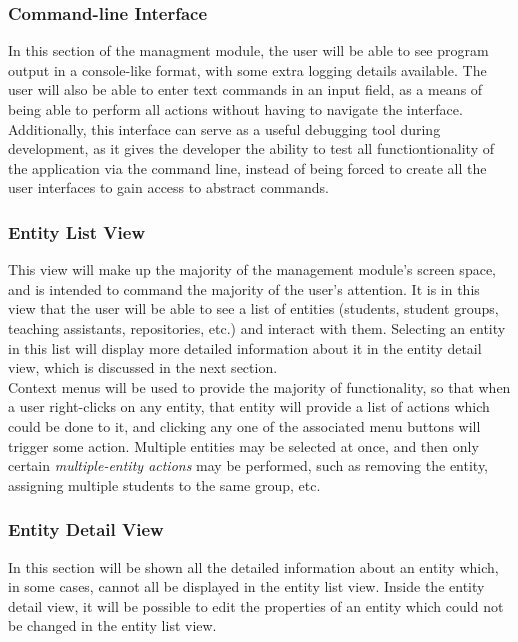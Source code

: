 \documentclass{article}
\begin{document}
		\subsubsection{Command-line Interface}
			In this section of the managment module, the user will be able to see program output in a console-like format, with some extra logging details available. The user will also be able to enter text commands in an input field, as a means of being able to perform all actions without having to navigate the interface. Additionally, this interface can serve as a useful debugging tool during development, as it gives the developer the ability to test all functiontionality of the application via the command line, instead of being forced to create all the user interfaces to gain access to abstract commands.
			
		\subsubsection{Entity List View}
			This view will make up the majority of the management module's screen space, and is intended to command the majority of the user's attention. It is in this view that the user will be able to see a list of entities (students, student groups, teaching assistants, repositories, etc.) and interact with them. Selecting an entity in this list will display more detailed information about it in the entity detail view, which is discussed in the next section.\\
			
			\noindent
			Context menus will be used to provide the majority of functionality, so that when a user right-clicks on any entity, that entity will provide a list of actions which could be done to it, and clicking any one of the associated menu buttons will trigger some action. Multiple entities may be selected at once, and then only certain \textit{multiple-entity actions} may be performed, such as removing the entity, assigning multiple students to the same group, etc.
		
		\subsubsection{Entity Detail View}
			In this section will be shown all the detailed information about an entity which, in some cases, cannot all be displayed in the entity list view. Inside the entity detail view, it will be possible to edit the properties of an entity which could not be changed in the entity list view.
\end{document}

